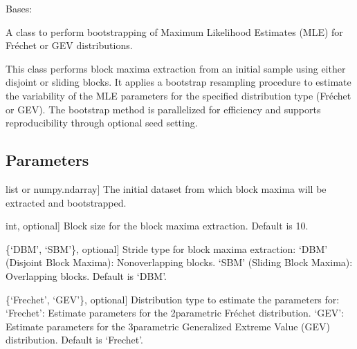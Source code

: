 \documentclass[a4paper,11pt,openany,english]{sphinxmanual}
\begin{document}
\begin{fulllineitems}
\label{\detokenize{api_bootstrap:xtremes.bootstrap.FullBootstrap}}
\pysigstartsignatures
{}
\pysigstopsignatures
\sphinxAtStartPar
Bases: 

\sphinxAtStartPar
A class to perform bootstrapping of Maximum Likelihood Estimates (MLE) for Fréchet or GEV distributions.

\sphinxAtStartPar
This class performs block maxima extraction from an initial sample using either disjoint or sliding blocks.
It applies a bootstrap resampling procedure to estimate the variability of the MLE parameters for the specified
distribution type (Fréchet or GEV). The bootstrap method is parallelized for efficiency and supports reproducibility
through optional seed setting.


\subsection{Parameters}
\label{\detokenize{api_bootstrap:parameters}}\begin{description}
\sphinxlineitem{initial\_sample}{[}list or numpy.ndarray{]}
\sphinxAtStartPar
The initial dataset from which block maxima will be extracted and bootstrapped.

\sphinxlineitem{bs}{[}int, optional{]}
\sphinxAtStartPar
Block size for the block maxima extraction. Default is 10.

\sphinxlineitem{stride}{[}\{‘DBM’, ‘SBM’\}, optional{]}
\sphinxAtStartPar
Stride type for block maxima extraction:
\sphinxhyphen{} ‘DBM’ (Disjoint Block Maxima): Non\sphinxhyphen{}overlapping blocks.
\sphinxhyphen{} ‘SBM’ (Sliding Block Maxima): Overlapping blocks.
Default is ‘DBM’.

\sphinxlineitem{dist\_type}{[}\{‘Frechet’, ‘GEV’\}, optional{]}
\sphinxAtStartPar
Distribution type to estimate the parameters for:
\sphinxhyphen{} ‘Frechet’: Estimate parameters for the 2\sphinxhyphen{}parametric Fréchet distribution.
\sphinxhyphen{} ‘GEV’: Estimate parameters for the 3\sphinxhyphen{}parametric Generalized Extreme Value (GEV) distribution.
Default is ‘Frechet’.


\end{description}
\end{fulllineitems}
\end{document}
